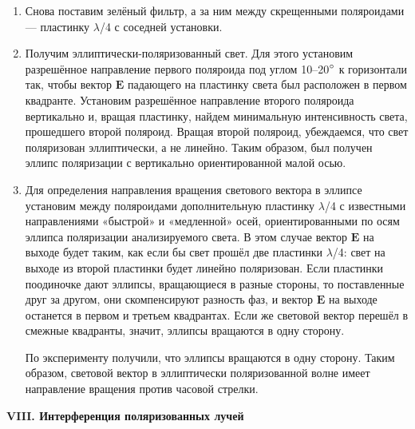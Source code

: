 \documentclass[a4paper,12pt]{article} %
\begin{document}
\begin{enumerate}
	
		\item Снова поставим зелёный фильтр, а за ним между скрещенными поляроидами — пластинку $\lambda$/4 с соседней установки.
		
		\item Получим эллиптически-поляризованный свет. Для этого установим разрешённое направление первого поляроида под углом 10–20$\degree$ к горизонтали так, чтобы вектор $\boldsymbol{E}$ падающего на пластинку света был расположен в первом квадранте. Установим разрешённое направление второго поляроида вертикально и, вращая пластинку, найдем минимальную интенсивность света, прошедшего второй поляроид. Вращая второй поляроид, убеждаемся, что свет поляризован эллиптически, а не линейно. Таким образом, был получен эллипс поляризации с вертикально ориентированной малой осью.
		
		\item Для определения направления вращения светового вектора в эллипсе установим между поляроидами дополнительную пластинку $\lambda$/4 с известными направлениями «быстрой» и «медленной» осей, ориентированными по осям эллипса поляризации анализируемого света. В этом случае вектор $\boldsymbol{E}$ на выходе будет таким, как если бы свет прошёл две пластинки $\lambda$/4: свет на выходе из второй пластинки будет линейно поляризован. Если пластинки поодиночке дают эллипсы, вращающиеся в разные стороны, то поставленные друг за другом, они скомпенсируют разность фаз, и вектор $\boldsymbol{E}$ на выходе останется в первом и третьем квадрантах. Если же световой вектор перешёл в смежные квадранты, значит, эллипсы вращаются в одну сторону.
		
		По эксперименту получили, что эллипсы вращаются в одну сторону. Таким образом, световой вектор в эллиптически поляризованной волне имеет направление вращения против часовой стрелки.
	
	\end{enumerate}


	\begin{center}
		\textbf{VIII. Интерференция поляризованных лучей}
	\end{center}
\end{document}
